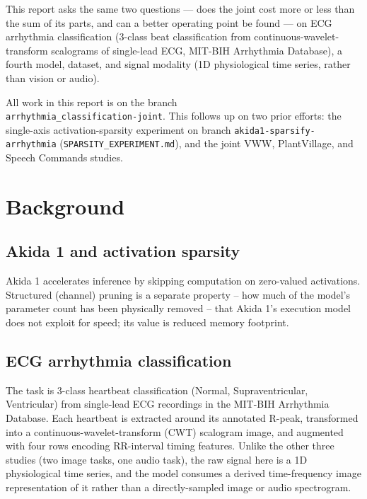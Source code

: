 \documentclass[11pt]{article}
\newcommand{\code}[1]{\texttt{#1}}
\begin{document}
This report asks the same two questions --- does the joint cost more or less than the sum of its parts, and can a better operating point be found --- on ECG arrhythmia classification (3-class beat classification from continuous-wavelet-transform scalograms of single-lead ECG, MIT-BIH Arrhythmia Database), a fourth model, dataset, and signal modality (1D physiological time series, rather than vision or audio).

All work in this report is on the branch\\
\code{arrhythmia\_\allowbreak classification-\allowbreak joint}.
This follows up on two prior efforts: the single-axis activation-sparsity
experiment on branch \code{akida1-\allowbreak sparsify-\allowbreak arrhythmia}
(\code{SPARSITY\_EXPERIMENT.\allowbreak md}), and the joint VWW, PlantVillage,
and Speech Commands studies.

\section{Background}

\subsection{Akida 1 and activation sparsity}

Akida 1 accelerates inference by skipping computation on zero-valued activations. Structured (channel) pruning is a separate property -- how much of the model's parameter count has been physically removed -- that Akida 1's execution model does not exploit for speed; its value is reduced memory footprint.

\subsection{ECG arrhythmia classification}

The task is 3-class heartbeat classification (Normal, Supraventricular, Ventricular) from single-lead ECG recordings in the MIT-BIH Arrhythmia Database. Each heartbeat is extracted around its annotated R-peak, transformed into a continuous-wavelet-transform (CWT) scalogram image, and augmented with four rows encoding RR-interval timing features. Unlike the other three studies (two image tasks, one audio task), the raw signal here is a 1D physiological time series, and the model consumes a derived time-frequency image representation of it rather than a directly-sampled image or audio spectrogram.
\end{document}
